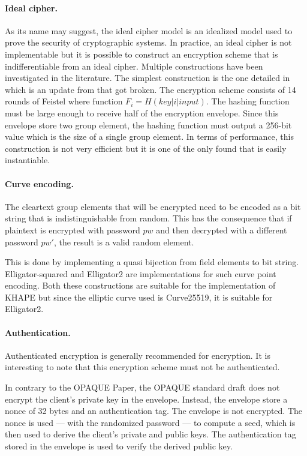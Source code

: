 ﻿\documentclass[../report.tex]{subfiles}
\begin{document}
\paragraph{Ideal cipher.}
As its name may suggest, the ideal cipher model is an idealized model used to prove the security of cryptographic systems.
In practice, an ideal cipher is not implementable %
but it is possible to construct an encryption scheme that is indifferentiable from an ideal cipher. Multiple constructions have been investigated in the literature.
The simplest construction is the one detailed in \cite{Ideal_Cipher_2} which is an update from \cite{Ideal_Cipher_1} that got broken.
The encryption scheme consists of 14 rounds of Feistel where function $F_i = H(key | i | input)$.
The hashing function must be large enough to receive half of the encryption envelope. Since this envelope store two group element, the hashing function must output a 256-bit value which is the size of a single group element.
In terms of performance, this construction is not very efficient but it is one of the only found that is easily instantiable.

\paragraph{Curve encoding.}
The cleartext group elements that will be encrypted need to be encoded as a bit string that is indistinguishable from random. This has the consequence that if plaintext is encrypted with password $pw$ and then decrypted with a different password $pw'$, the result is a valid random element.

This is done by implementing a quasi bijection from field elements to bit string.
Elligator-squared \cite{Elligator_Squared_Paper} and Elligator2 \cite{Elligator2_Paper} are implementations for such curve point encoding.
Both these constructions are suitable for the implementation of KHAPE but since the elliptic curve used is Curve25519, it is suitable for Elligator2.
\paragraph{Authentication.}
Authenticated encryption is generally recommended for encryption.
It is interesting to note that this encryption scheme must not be authenticated. 

In contrary to the OPAQUE Paper, the OPAQUE standard draft does not encrypt the client's private key in the envelope.
Instead, the envelope store a nonce of 32 bytes and an authentication tag. The envelope is not encrypted.
The nonce is used --- with the randomized password --- to compute a seed, which is then used to derive the client's private and public keys. The authentication tag stored in the envelope is used to verify the derived public key.
\end{document}
